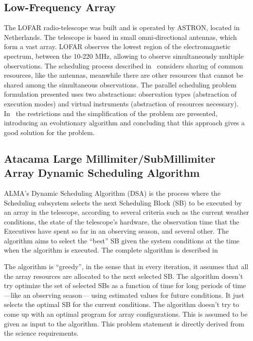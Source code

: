 \subsection{Low-Frequency Array}
The LOFAR radio-telescope was built and is operated by ASTRON, located in Netherlands. The telescope is based in small omni-directional antennas, which form a vast array. LOFAR observes the lowest region of the electromagnetic spectrum, between the 10-220 MHz, allowing to observe simultaneously multiple observations. The scheduling process described in~\cite{RJBHW2002} considers sharing of common resources, like the antennas, meanwhile there are other resources that cannot be shared among the simultaneous observations.  The parallel scheduling problem formulation presented uses two abstractions: observation types (abstraction of execution modes) and virtual instruments (abstraction of resources necessary). In~\cite{RJBHW2002} the restrictions and the simplification of the problem are presented, introducing an evolutionary algorithm and concluding that this approach gives a good solution for the problem.

\subsection{Atacama Large Millimiter/SubMillimiter Array Dynamic Scheduling Algorithm}
\label{sec:alma-dsa}

ALMA's Dynamic Scheduling Algorithm (DSA) is the process where the Scheduling subsystem selects the next Scheduling Block (SB) to be executed by an array in the telescope, according to several criteria such as the current weather conditions, the state of the telescope's hardware, the observation time that the Executives have spent so far in an observing season, and several other. The algorithm aims to select the ``best'' SB given the system conditions at the time when the algorithm is executed. The complete algorithm is described in \cite{avarias11} 

The algorithm is ``greedy'', in the sense that in every iteration, it assumes that all the array resources are allocated to the next selected SB. The algorithm doesn't try optimize the set of selected SBs as a function of time for long periods of time ---like an observing season--- using estimated values for future conditions. It just selects the optimal SB for the current conditions. The algorithm doesn't try to come up with an optimal program for array configurations. This is assumed to be given as input to the algorithm. This problem statement is directly derived from the science requirements.

